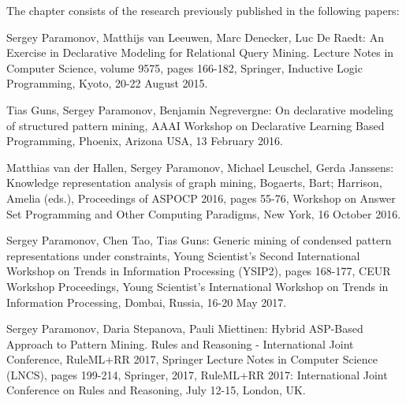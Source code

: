 The chapter consists of the research previously published in the following papers:
\begin{addmargin}[2em]{2em}
Sergey Paramonov, Matthijs van Leeuwen, Marc Denecker, Luc De Raedt:
An Exercise in Declarative Modeling for Relational Query Mining.
Lecture Notes in Computer Science, volume 9575, pages 166-182,
    Springer, Inductive Logic Programming, Kyoto, 20-22 August 2015.

Tias Guns, Sergey Paramonov, Benjamin Negrevergne: On declarative
    modeling of structured pattern mining, AAAI Workshop on
    Declarative Learning Based Programming, Phoenix, Arizona USA, 13
    February 2016.

Matthias van der Hallen, Sergey Paramonov, Michael Leuschel, Gerda
    Janssens: Knowledge representation analysis of graph mining,
    Bogaerts, Bart; Harrison, Amelia (eds.), Proceedings of ASPOCP
    2016, pages 55-76, Workshop on Answer Set Programming and Other
    Computing Paradigms, New York, 16 October 2016.

Sergey Paramonov, Chen Tao, Tias Guns: Generic mining of condensed
    pattern representations under constraints, Young Scientist's
    Second International Workshop on Trends in Information Processing
    (YSIP2), pages 168-177, CEUR Workshop Proceedings, Young
    Scientist's International Workshop on Trends in Information
    Processing, Dombai, Russia, 16-20 May 2017.

Sergey Paramonov, Daria Stepanova, Pauli Miettinen:
Hybrid ASP-Based Approach to Pattern Mining.  
Rules and Reasoning - International Joint Conference, RuleML+RR 2017,
    Springer Lecture Notes in Computer Science (LNCS), pages 199-214,
    Springer, 2017, RuleML+RR 2017: International Joint Conference on
    Rules and Reasoning, July 12-15, London, UK.
\end{addmargin}






